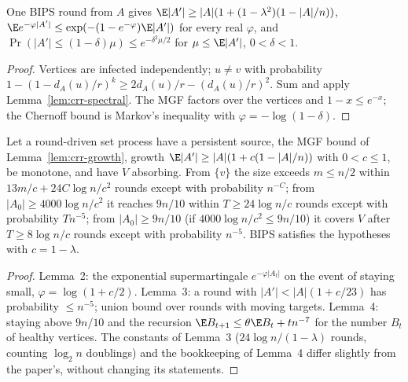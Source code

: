 \begin{lemma}\label{lem:crr-growth}
\leanok{}
One BIPS round from $A$ gives $\E|A'|\ge|A|(1+(1-\lambda^2)(1-|A|/n))$,
$\E e^{-\varphi|A'|}\le\exp(-(1-e^{-\varphi})\E|A'|)$ for every real $\varphi$, and
$\Pr(|A'|\le(1-\delta)\mu)\le e^{-\delta^2\mu/2}$ for $\mu\le\E|A'|$, $0<\delta<1$.
\end{lemma}
\begin{proof}\leanok
Vertices are infected independently; $u\ne v$ with probability $1-(1-d_A(u)/r)^k\ge
2d_A(u)/r-(d_A(u)/r)^2$. Sum and apply Lemma~\ref{lem:crr-spectral}. The MGF factors over the
vertices and $1-x\le e^{-x}$; the Chernoff bound is Markov's inequality with
$\varphi=-\log(1-\delta)$.
\end{proof}

\begin{theorem}\label{thm:crr-phases}
\leanok{}
Let a round-driven set process have a persistent source, the MGF bound of
Lemma~\ref{lem:crr-growth}, growth $\E|A'|\ge|A|(1+c(1-|A|/n))$ with $0<c\le1$, be monotone, and
have $V$ absorbing. From $\{v\}$ the size exceeds $m\le n/2$ within $13m/c+24C\log n/c^2$ rounds
except with probability $n^{-C}$; from $|A_0|\ge4000\log n/c^2$ it reaches $9n/10$ within
$T\ge24\log n/c$ rounds except with probability $T n^{-5}$; from $|A_0|\ge9n/10$ (if
$4000\log n/c^2\le 9n/10$) it covers $V$ after $T\ge8\log n/c$ rounds except with probability
$n^{-5}$. BIPS satisfies the hypotheses with $c=1-\lambda$.
\end{theorem}
\begin{proof}\leanok
Lemma~2: the exponential supermartingale $e^{-\varphi|A_t|}$ on the event of staying small,
$\varphi=\log(1+c/2)$. Lemma~3: a round with $|A'|<|A|(1+c/23)$ has probability $\le n^{-5}$;
union bound over rounds with moving targets. Lemma~4: staying above $9n/10$ and the recursion
$\E B_{t+1}\le\theta\E B_t+tn^{-7}$ for the number $B_t$ of healthy vertices. The constants
of Lemma~3 ($24\log n/(1-\lambda)$ rounds, counting $\log_2 n$ doublings) and the bookkeeping
of Lemma~4 differ slightly from the paper's, without changing its statements.
\end{proof}

